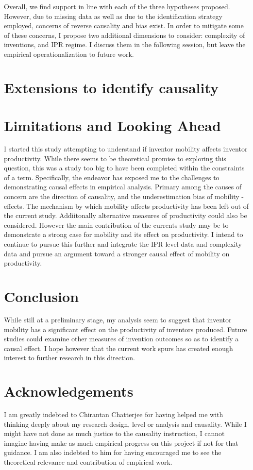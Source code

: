 \documentclass[12pt]{article}
\begin{document}
Overall, we find support in line with each of the three hypotheses proposed. However, due to missing data as well as due to the identification strategy employed, concerns of reverse causality and bias exist. In order to mitigate some of these concerns, I propose two additional dimensions to consider: complexity of inventions, and IPR regime. I discuss them in the following session, but leave the empirical operationalization to future work.


\section{Extensions to identify causality}

\section{Limitations and Looking Ahead}
I started this study attempting to understand if inventor mobility affects inventor productivity. While there seems to be theoretical promise to exploring this question, this was a study too big to have been completed within the constraints of a term. Specifically, the endeavor has exposed me to the challenges to demonstrating causal effects in empirical analysis. Primary among the causes of concern are the direction of causality, and the underestimation bias of mobility - effects. The mechanism by which mobility affects productivity has been left out of the current study. Addiitonally alternative measures of productivity could also be considered. However the main contribution of the currents study may be to demonstrate a strong case for mobility and its effect on productivity.  I intend to continue to pursue this further and integrate the IPR level data and complexity data and pursue an argument toward a stronger causal effect of mobility on productivity.

\section{Conclusion}
While still at a preliminary stage, my analysis seem to suggest that inventor mobility  has a significant effect on the productivity of inventors produced. Future studies could  examine other measures of invention outcomes so as to identify a causal effect. I hope however that the current work spurs has created enough interest to further research in this direction.


\section*{Acknowledgements}
I am greatly indebted to Chirantan Chatterjee for having helped me with thinking deeply about my research design, level or analysis and causality. While I might have not done as much justice to the causality instruction, I cannot imagine having make as much empirical progress on this project if not for that guidance. I am also indebted to him for having encouraged me to see the theoretical relevance and contribution of empirical work.
\end{document}

